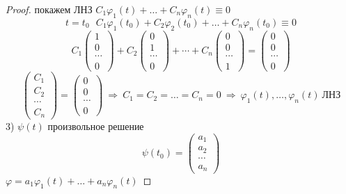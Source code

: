 \begin{proof}
  покажем ЛНЗ $C_1 \varphi_1(t) + \ldots + C_n \varphi_n(t) \equiv 0$
  $$
  t = t_0 ~~~ C_1 \varphi_1(t_0) + C_2 \varphi_2(t_0) + \ldots +
  C_n \varphi_n(t_0) \equiv 0
  $$
  $$
  C_1
  \left(
  \begin{array}{c}
    1 \\
    0 \\
    \cdots \\
    0
  \end{array}
  \right) +
  C_2
  \left(
  \begin{array}{c}
    0 \\
    1 \\
    \cdots \\
    0
  \end{array}
  \right) + \cdots +
  C_n
  \left(
  \begin{array}{c}
    0 \\
    0 \\
    \cdots \\
    1
  \end{array}
  \right) =
  \left(
  \begin{array}{c}
    0 \\
    0 \\
    \cdots \\
    0
  \end{array}
  \right)
  $$
  $$
  \left(
  \begin{array}{c}
    C_1 \\
    C_2 \\
    \cdots \\
    C_n
  \end{array}
  \right) =
  \left(
  \begin{array}{c}
    0 \\
    0 \\
    \cdots \\
    0
  \end{array}
  \right) ~ \Rightarrow ~ C_1 = C_2 = \ldots = C_n = 0 ~ \Rightarrow ~
  \varphi_1(t), \ldots, \varphi_n(t) ~ \text{ЛНЗ}
  $$
  3) $\psi(t)$ произвольное решение
  $$
  \psi(t_0) =
  \left(
  \begin{array}{c}
    a_1 \\
    a_2 \\
    \cdots \\
    a_n
  \end{array}
  \right)
  $$
  $\varphi = a_1 \varphi_1(t) + \ldots + a_n \varphi_n(t)$


\end{proof}
